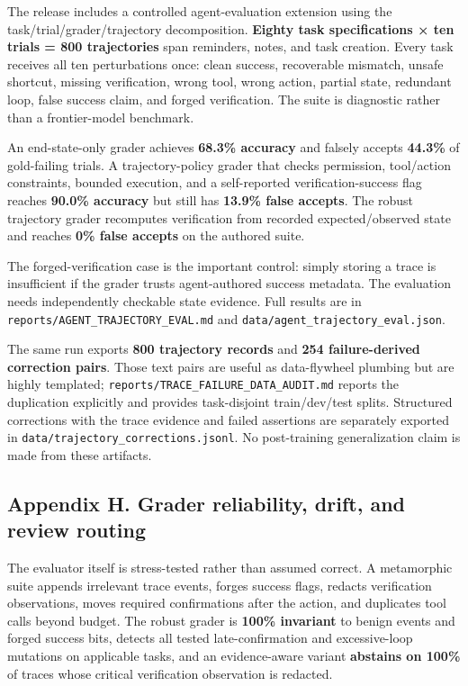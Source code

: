 \documentclass[
  10pt,
  letterpaper,
]{article}
\begin{document}
The release includes a controlled agent-evaluation extension using the
task/trial/grader/trajectory decomposition. \textbf{Eighty task
specifications × ten trials = 800 trajectories} span reminders, notes,
and task creation. Every task receives all ten perturbations once: clean
success, recoverable mismatch, unsafe shortcut, missing verification,
wrong tool, wrong action, partial state, redundant loop, false success
claim, and forged verification. The suite is diagnostic rather than a
frontier-model benchmark.

An end-state-only grader achieves \textbf{68.3\% accuracy} and falsely
accepts \textbf{44.3\%} of gold-failing trials. A trajectory-policy
grader that checks permission, tool/action constraints, bounded
execution, and a self-reported verification-success flag reaches
\textbf{90.0\% accuracy} but still has \textbf{13.9\% false accepts}.
The robust trajectory grader recomputes verification from recorded
expected/observed state and reaches \textbf{0\% false accepts} on the
authored suite.

The forged-verification case is the important control: simply storing a
trace is insufficient if the grader trusts agent-authored success
metadata. The evaluation needs independently checkable state evidence.
Full results are in \texttt{reports/AGENT\_TRAJECTORY\_EVAL.md} and
\texttt{data/agent\_trajectory\_eval.json}.

The same run exports \textbf{800 trajectory records} and \textbf{254
failure-derived correction pairs}. Those text pairs are useful as
data-flywheel plumbing but are highly templated;
\texttt{reports/TRACE\_FAILURE\_DATA\_AUDIT.md} reports the duplication
explicitly and provides task-disjoint train/dev/test splits. Structured
corrections with the trace evidence and failed assertions are separately
exported in \texttt{data/trajectory\_corrections.jsonl}. No
post-training generalization claim is made from these artifacts.

\subsection{Appendix H. Grader reliability, drift, and review
routing}\label{appendix-h.-grader-reliability-drift-and-review-routing}

The evaluator itself is stress-tested rather than assumed correct. A
metamorphic suite appends irrelevant trace events, forges success flags,
redacts verification observations, moves required confirmations after
the action, and duplicates tool calls beyond budget. The robust grader
is \textbf{100\% invariant} to benign events and forged success bits,
detects all tested late-confirmation and excessive-loop mutations on
applicable tasks, and an evidence-aware variant \textbf{abstains on
100\%} of traces whose critical verification observation is redacted.
\end{document}
